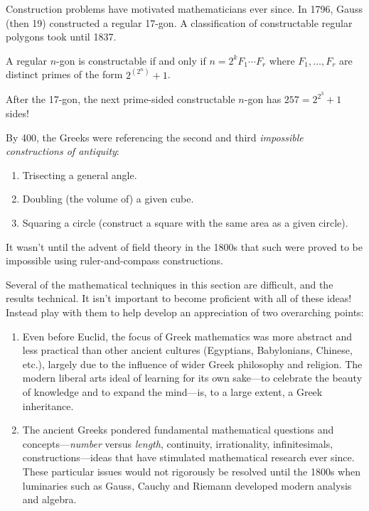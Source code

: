 Construction problems have motivated mathematicians ever since. In 1796, Gauss (then 19) constructed a regular 17-gon. A classification of constructable regular polygons took until 1837.

\begin{thm*}{}{}
	A regular $n$-gon is constructable if and only if $n=2^kF_1\cdots F_r$ where $F_1,\ldots,F_r$ are distinct primes of the form $2^{(2^n)}+1$.
\end{thm*}

After the 17-gon, the next prime-sided constructable $n$-gon has $257=2^{2^3}+1$ sides!\smallbreak

By 400\BC, the Greeks were referencing the second and third \emph{impossible constructions of antiquity}:
\begin{enumerate}\itemsep0pt
  \item Trisecting a general angle.
  \item Doubling (the volume of) a given cube.
  \item Squaring a circle (construct a square with the same area as a given circle).\footnotemark
\end{enumerate}
It wasn't until the advent of field theory in the 1800s that such were proved to be impossible using ruler-and-compass constructions.




Several of the mathematical techniques in this section are difficult, and the results technical. It isn't important to become proficient with all of these ideas! Instead play with them to help develop an appreciation of two overarching points:
\begin{enumerate}
  \item Even before Euclid, the focus of Greek mathematics was more abstract and less practical than other ancient cultures (Egyptians, Babylonians, Chinese, etc.), largely due to the influence of wider Greek philosophy and religion. The modern liberal arts ideal of learning for its own sake---to celebrate the beauty of knowledge and to expand the mind---is, to a large extent, a Greek inheritance. 
  \item The ancient Greeks pondered fundamental mathematical questions and concepts---\emph{number} versus \emph{length}, continuity, irrationality, infinitesimals, constructions---ideas that have stimulated mathematical research ever since. These particular issues would not rigorously be resolved until the 1800s  when luminaries such as Gauss, Cauchy and Riemann developed modern analysis and algebra.
\end{enumerate}


